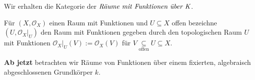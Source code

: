 Wir erhalten die Kategorie der $\emph{Räume mit Funktionen über K}$.
\begin{defn}
  \label{def:raeume-mit-fkt-offener-unterraum}
  Für $(X,\mathcal{O}_{X})$ einen Raum mit Funktionen und $U\subseteq X$ offen bezeichne $(U,\mathcal{O}_{X}|_{U})$ den
  Raum mit Funktionen gegeben durch den topologischen Raum $U$ mit
  Funktionen $\mathcal{O}_{X}|_{U}(V):=\mathcal{O}_{X}(V)$ für $V\underset{\text{offen}}{\subseteq}U\subseteq X$.
\end{defn}
\textbf{Ab jetzt} betrachten wir Räume von Funktionen über einem fixierten, algebraisch abgeschlossenen Grundkörper $k$.

